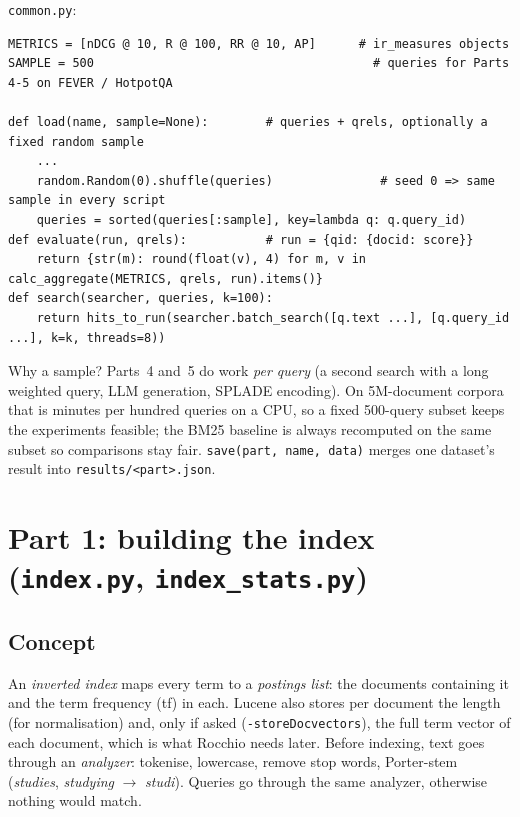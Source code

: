 \documentclass[11pt,a4paper]{article}
\begin{document}
\texttt{common.py}:
\begin{lstlisting}
METRICS = [nDCG @ 10, R @ 100, RR @ 10, AP]      # ir_measures objects
SAMPLE = 500                                       # queries for Parts 4-5 on FEVER / HotpotQA

def load(name, sample=None):        # queries + qrels, optionally a fixed random sample
    ...
    random.Random(0).shuffle(queries)               # seed 0 => same sample in every script
    queries = sorted(queries[:sample], key=lambda q: q.query_id)
def evaluate(run, qrels):           # run = {qid: {docid: score}}
    return {str(m): round(float(v), 4) for m, v in calc_aggregate(METRICS, qrels, run).items()}
def search(searcher, queries, k=100):
    return hits_to_run(searcher.batch_search([q.text ...], [q.query_id ...], k=k, threads=8))
\end{lstlisting}
Why a sample? Parts~4 and~5 do work \emph{per query} (a second search with a long weighted query, LLM generation, SPLADE
encoding). On 5M-document corpora that is minutes per hundred queries on a CPU, so a fixed 500-query subset keeps the
experiments feasible; the BM25 baseline is always recomputed on the same subset so comparisons stay fair.
\texttt{save(part, name, data)} merges one dataset's result into \texttt{results/<part>.json}.

\section{Part 1: building the index (\texttt{index.py}, \texttt{index\_stats.py})}
\subsection{Concept}
An \emph{inverted index} maps every term to a \emph{postings list}: the documents containing it and the term frequency (tf) in
each. Lucene also stores per document the length (for normalisation) and, only if asked (\texttt{-storeDocvectors}), the full
term vector of each document, which is what Rocchio needs later. Before indexing, text goes through an \emph{analyzer}:
tokenise, lowercase, remove stop words, Porter-stem (\emph{studies}, \emph{studying} $\to$ \emph{studi}). Queries go
through the same analyzer, otherwise nothing would match.
\end{document}
